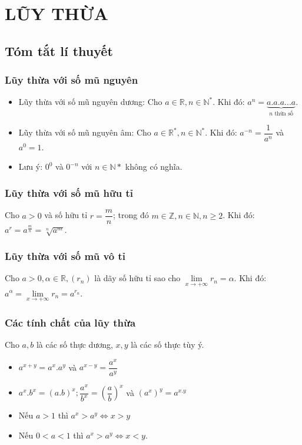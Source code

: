 \section{LŨY THỪA}
\subsection{Tóm tắt lí thuyết}
\subsubsection{Lũy thừa với số mũ nguyên}
\begin{itemize}
	\item Lũy thừa với số mũ nguyên dương: Cho $a\in \mathbb{R}, n\in {\mathbb{N}}^{*}$. Khi đó: $a^n=\underbrace{a.a.a...a}_{n \text{ thừa số}}$.
	\item Lũy thừa với số mũ nguyên âm: Cho $a\in \mathbb{R}^{*}, n\in {\mathbb{N}}^{*}$. Khi đó: $a^{-n}=\dfrac{1}{a^n}$ và $a^0=1$.
	\item Lưu ý: $0^0$ và $0^{-n}$ với $ n\in \mathbb{N*} $ không có nghĩa.
\end{itemize}
\subsubsection{Lũy thừa với số mũ hữu tỉ}
Cho $a>0$ và số hữu tỉ $r=\dfrac{m}{n}$; trong đó $m\in \mathbb{Z},n\in \mathbb{N},n\ge 2$. Khi đó: $a^r={a}^{\tfrac{m}{n}}=\sqrt[n]{a^m}$.
\subsubsection{Lũy thừa với số mũ vô tỉ}
Cho $a>0, \alpha \in \mathbb{R}, (r_n)$ là dãy số hữu tỉ sao cho $\underset{x\to+\infty}{\mathop{\lim}}r_n=\alpha$. Khi đó: $a^{\alpha}=\underset{x\to+\infty}{\mathop{\lim}}r_n=a^{r_n}$.
\subsubsection{Các tính chất của lũy thừa}
 Cho $a, b$ là các số thực dương, $x, y$ là các số thực tùy ý.
 \begin{itemize}
 	\item ${a}^{x+y}=a^x.a^y$ và ${a}^{x-y}=\dfrac{a^x}{a^y}$
 	\item $a^x.b^x=(a.b)^x; \dfrac{a^x}{b^x}={\left(\dfrac{a}{b}\right)}^x$ và $(a^x)^y={a}^{x.y}$
 	\item Nếu $a>1$ thì $a^x>a^y\Leftrightarrow x>y$
 	\item Nếu $0<a<1$ thì $a^x>a^y\Leftrightarrow x<y$.
 \end{itemize}
